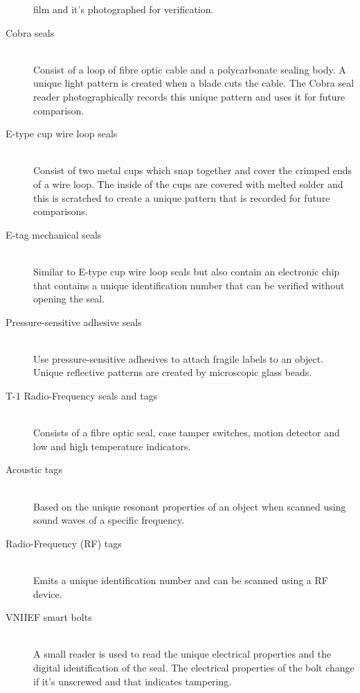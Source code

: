 \documentclass[twoside,titlepage,11pt,twocolumn,a4paper]{article}
\begin{document}
\begin{description}
    film and it’s photographed for verification.
  \item[Cobra seals] \hfill \\ Consist of a loop of fibre optic cable
    and a polycarbonate sealing body. A unique light pattern is
    created when a blade cuts the cable. The Cobra seal reader
    photographically records this unique pattern and uses it for
    future comparison.
  \item[E-type cup wire loop seals] \hfill \\ Consist of two metal
    cups which snap together and cover the crimped ends of a wire
    loop. The inside of the cups are covered with melted solder and
    this is scratched to create a unique pattern that is recorded for
    future comparisons.
  \item[E-tag mechanical seals] \hfill \\ Similar to E-type cup wire
    loop seals but also contain an electronic chip that contains a
    unique identification number that can be verified without opening
    the seal.
  \item[Pressure-sensitive adhesive seals] \hfill \\ Use
    pressure-sensitive adhesives to attach fragile labels to an
    object. Unique reflective patterns are created by microscopic
    glass beads.
  \item[T-1 Radio-Frequency seals and tags] \hfill \\ Consists of a
    fibre optic seal, case tamper switches, motion detector and low
    and high temperature indicators.
  \item[Acoustic tags] \hfill \\ Based on the unique resonant
    properties of an object when scanned using sound waves of a
    specific frequency.
  \item[Radio-Frequency (RF) tags] \hfill \\ Emits a unique
    identification number and can be scanned using a RF device.
  \item[VNIIEF smart bolts] \hfill \\ A small reader is used to read
    the unique electrical properties and the digital identification of
    the seal. The electrical properties of the bolt change if it’s
    unscrewed and that indicates tampering.
\end{description}
\end{document}
